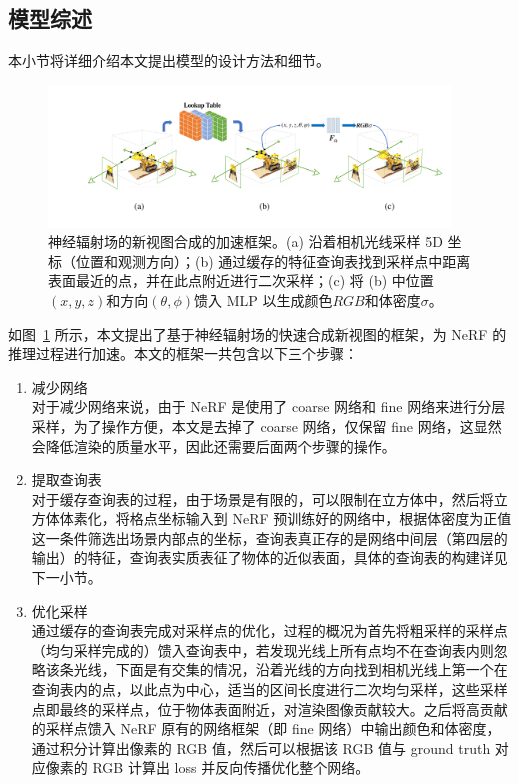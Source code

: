 \subsection{模型综述}
本小节将详细介绍本文提出模型的设计方法和细节。
\begin{figure}[t]
    \centering
    \includegraphics[width=0.95\textwidth, height=0.25\textheight]{figures/fnerf.pdf}
    \caption{神经辐射场的新视图合成的加速框架。(a) 沿着相机光线采样 5D 坐标（位置和观测方向）；(b) 通过缓存的特征查询表找到采样点中距离表面最近的点，并在此点附近进行二次采样；(c) 将 (b) 中位置$\left(x, y, z\right)$和方向$\left(\theta, \phi\right)$馈入 MLP 以生成颜色$RGB$和体密度$\sigma$。}
    \label{fig:fnerf}
\end{figure}
如图~\ref{fig:fnerf} 所示，本文提出了基于神经辐射场的快速合成新视图的框架，为 NeRF 的推理过程进行加速。本文的框架一共包含以下三个步骤：
\begin{enumerate}
	\item 减少网络 \\
	对于减少网络来说，由于 NeRF 是使用了 coarse 网络和 fine 网络来进行分层采样，为了操作方便，本文是去掉了 coarse 网络，仅保留 fine 网络，这显然会降低渲染的质量水平，因此还需要后面两个步骤的操作。
	\item 提取查询表 \\
	对于缓存查询表的过程，由于场景是有限的，可以限制在立方体中，然后将立方体体素化，将格点坐标输入到 NeRF 预训练好的网络中，根据体密度为正值这一条件筛选出场景内部点的坐标，查询表真正存的是网络中间层（第四层的输出）的特征，查询表实质表征了物体的近似表面，具体的查询表的构建详见下一小节。
	\item 优化采样 \\
	通过缓存的查询表完成对采样点的优化，过程的概况为首先将粗采样的采样点（均匀采样完成的）馈入查询表中，若发现光线上所有点均不在查询表内则忽略该条光线，下面是有交集的情况，沿着光线的方向找到相机光线上第一个在查询表内的点，以此点为中心，适当的区间长度进行二次均匀采样，这些采样点即最终的采样点，位于物体表面附近，对渲染图像贡献较大。之后将高贡献的采样点馈入 NeRF 原有的网络框架（即 fine 网络）中输出颜色和体密度，通过积分计算出像素的 RGB 值，然后可以根据该 RGB 值与 ground truth 对应像素的 RGB 计算出 loss 并反向传播优化整个网络。
\end{enumerate}            
